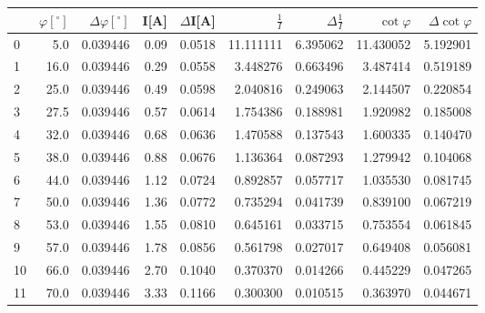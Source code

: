 \begin{tabular}{lrrrrrrrr}
\toprule
{} &  $\varphi[^\circ]$ &  $\Delta \varphi[^\circ]$ &  I[A] &  $\Delta$I[A] &  $\frac{1}{I}$ &  $\Delta \frac{1}{I}$ &  $\cot{\varphi}$ &  $\Delta \cot{\varphi}$ \\
\midrule
0  &                5.0 &                  0.039446 &  0.09 &        0.0518 &      11.111111 &              6.395062 &        11.430052 &                5.192901 \\
1  &               16.0 &                  0.039446 &  0.29 &        0.0558 &       3.448276 &              0.663496 &         3.487414 &                0.519189 \\
2  &               25.0 &                  0.039446 &  0.49 &        0.0598 &       2.040816 &              0.249063 &         2.144507 &                0.220854 \\
3  &               27.5 &                  0.039446 &  0.57 &        0.0614 &       1.754386 &              0.188981 &         1.920982 &                0.185008 \\
4  &               32.0 &                  0.039446 &  0.68 &        0.0636 &       1.470588 &              0.137543 &         1.600335 &                0.140470 \\
5  &               38.0 &                  0.039446 &  0.88 &        0.0676 &       1.136364 &              0.087293 &         1.279942 &                0.104068 \\
6  &               44.0 &                  0.039446 &  1.12 &        0.0724 &       0.892857 &              0.057717 &         1.035530 &                0.081745 \\
7  &               50.0 &                  0.039446 &  1.36 &        0.0772 &       0.735294 &              0.041739 &         0.839100 &                0.067219 \\
8  &               53.0 &                  0.039446 &  1.55 &        0.0810 &       0.645161 &              0.033715 &         0.753554 &                0.061845 \\
9  &               57.0 &                  0.039446 &  1.78 &        0.0856 &       0.561798 &              0.027017 &         0.649408 &                0.056081 \\
10 &               66.0 &                  0.039446 &  2.70 &        0.1040 &       0.370370 &              0.014266 &         0.445229 &                0.047265 \\
11 &               70.0 &                  0.039446 &  3.33 &        0.1166 &       0.300300 &              0.010515 &         0.363970 &                0.044671 \\
\bottomrule
\end{tabular}
